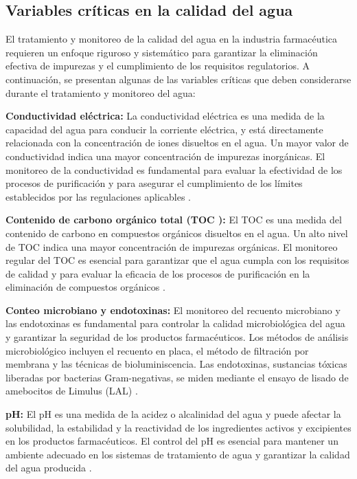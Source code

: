 \subsection{Variables críticas en la calidad del agua}

El tratamiento y monitoreo de la calidad del agua en la industria farmacéutica requieren un enfoque riguroso y sistemático para garantizar la eliminación efectiva de impurezas y el cumplimiento de los requisitos regulatorios. A continuación, se presentan algunas de las variables críticas que deben considerarse durante el tratamiento y monitoreo del agua:

\textbf{Conductividad eléctrica:} La conductividad eléctrica es una medida de la capacidad del agua para conducir la corriente eléctrica, y
está directamente relacionada con la concentración de iones disueltos en el agua. Un mayor valor de conductividad indica una mayor
concentración de impurezas inorgánicas. El monitoreo de la conductividad es fundamental para evaluar la efectividad de los procesos
de purificación y para asegurar el cumplimiento de los límites establecidos por las regulaciones aplicables \cite{oceanebidaultQueFactoresDeterminan}.

\textbf{Contenido de carbono orgánico total (TOC ):} El TOC es una medida del contenido de carbono en compuestos
orgánicos disueltos en el agua. Un alto nivel de TOC indica una mayor concentración de impurezas orgánicas.
El monitoreo regular del TOC es esencial para garantizar que el agua cumpla con los requisitos de calidad y para evaluar la eficacia
de los procesos de purificación en la eliminación de compuestos orgánicos \cite{oceanebidaultQueFactoresDeterminan}.

\textbf{Conteo microbiano y endotoxinas:} El monitoreo del recuento microbiano y las endotoxinas es fundamental
para controlar la calidad microbiológica del agua y garantizar la seguridad de los productos farmacéuticos.
Los métodos de análisis microbiológico incluyen el recuento en placa, el método de filtración por membrana
y las técnicas de bioluminiscencia. Las endotoxinas, sustancias tóxicas liberadas por bacterias Gram-negativas,
se miden mediante el ensayo de lisado de amebocitos de Limulus (LAL) \cite{oceanebidaultQueFactoresDeterminan}.

\textbf{pH:} El pH es una medida de la acidez o alcalinidad del agua y puede afectar la solubilidad,
la estabilidad y la reactividad de los ingredientes activos y excipientes en los productos farmacéuticos.
El control del pH es esencial para mantener un ambiente adecuado en los sistemas de tratamiento de agua y
garantizar la calidad del agua producida \cite{oceanebidaultQueFactoresDeterminan}.

